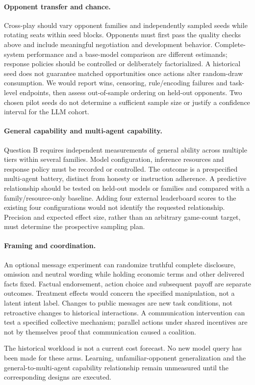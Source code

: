 \paragraph{Opponent transfer and chance.}
Cross-play should vary opponent families and independently sampled seeds while rotating seats within seed blocks. Opponents must first pass the quality checks above and include meaningful negotiation and development behavior. Complete-system performance and a base-model comparison are different estimands; response policies should be controlled or deliberately factorialized. A historical seed does not guarantee matched opportunities once actions alter random-draw consumption. We would report wins, censoring, rule/encoding failures and task-level endpoints, then assess out-of-sample ordering on held-out opponents. Two chosen pilot seeds do not determine a sufficient sample size or justify a confidence interval for the LLM cohort.

\paragraph{General capability and multi-agent capability.}
Question B requires independent measurements of general ability across multiple tiers within several families. Model configuration, inference resources and response policy must be recorded or controlled. The outcome is a prespecified multi-agent battery, distinct from honesty or instruction adherence. A predictive relationship should be tested on held-out models or families and compared with a family/resource-only baseline. Adding four external leaderboard scores to the existing four configurations would not identify the requested relationship. Precision and expected effect size, rather than an arbitrary game-count target, must determine the prospective sampling plan.

\paragraph{Framing and coordination.}
An optional message experiment can randomize truthful complete disclosure, omission and neutral wording while holding economic terms and other delivered facts fixed. Factual endorsement, action choice and subsequent payoff are separate outcomes. Treatment effects would concern the specified manipulation, not a latent intent label. Changes to public messages are new task conditions, not retroactive changes to historical interactions. A communication intervention can test a specified collective mechanism; parallel actions under shared incentives are not by themselves proof that communication caused a coalition.

The historical workload is not a current cost forecast. No new model query has been made for these arms. Learning, unfamiliar-opponent generalization and the general-to-multi-agent capability relationship remain unmeasured until the corresponding designs are executed.
